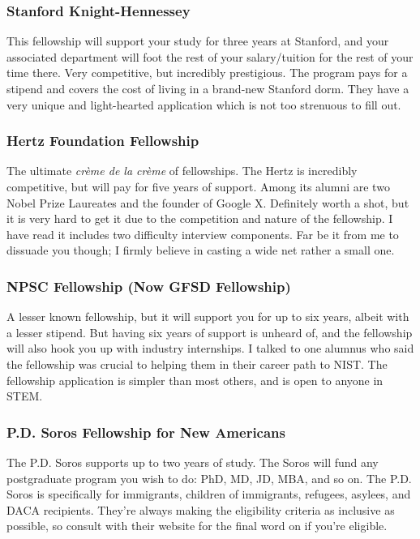 \documentclass[12pt]{article}
\begin{document}
\subsubsection{Stanford Knight-Hennessey}

This fellowship will support your study for three years at Stanford, and your associated department will foot the rest of your salary/tuition for the rest of your time there. Very competitive, but incredibly prestigious. The program pays for a stipend and covers the cost of living in a brand-new Stanford dorm. They have a very unique and light-hearted application which is not too strenuous to fill out.

\subsubsection{Hertz Foundation Fellowship}

The ultimate \textit{crème de la crème} of fellowships. The Hertz is incredibly competitive, but will pay for five years of support. Among its alumni are two Nobel Prize Laureates and the founder of Google X. Definitely worth a shot, but it is very hard to get it due to the competition and nature of the fellowship. I have read it includes two difficulty interview components. Far be it from me to dissuade you though; I firmly believe in casting a wide net rather a small one.

\subsubsection{NPSC Fellowship (Now GFSD Fellowship)
} 

A lesser known fellowship, but it will support you for up to six years, albeit with a lesser stipend. But having six years of support is unheard of, and the fellowship will also hook you up with industry internships. I talked to one alumnus who said the fellowship was crucial to helping them in their career path to NIST. The fellowship application is simpler than most others, and is open to anyone in STEM.

\subsubsection{P.D. Soros Fellowship for New Americans}

The P.D. Soros supports up to two years of study. The Soros will fund any postgraduate program you wish to do: PhD, MD, JD, MBA, and so on. The P.D. Soros is specifically for immigrants, children of immigrants, refugees, asylees, and DACA recipients. They’re always making the eligibility criteria as inclusive as possible, so consult with their website for the final word on if you’re eligible.
\end{document}
